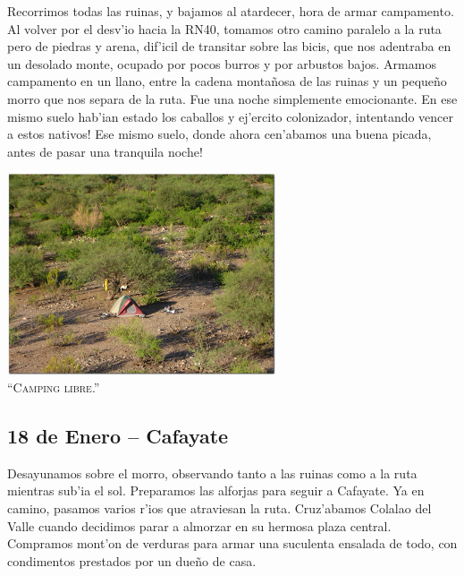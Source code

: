 Recorrimos todas las ruinas, y bajamos al atardecer, hora de armar campamento.
Al volver por el desv'io hacia la {\small RN}40, tomamos otro camino
paralelo a la ruta pero de piedras y arena, dif'icil de transitar sobre las
bicis, que nos adentraba en un desolado monte, ocupado por pocos burros y por
arbustos bajos. Armamos campamento en un llano, entre la cadena monta\~nosa de
las ruinas y un peque\~no morro que nos separa de la ruta. Fue una noche
simplemente emocionante. \textexclamdown En ese mismo suelo hab'ian estado los
caballos y ej'ercito colonizador, intentando vencer a estos nativos!
\textexclamdown Ese mismo suelo, donde ahora cen'abamos una buena picada, antes
de pasar una tranquila noche!

\begin{center}
\includegraphics[width=300px]{images/DSC0123.JPG}
\textsc{\\``Camping libre.''}
\end{center}

\subsection*{18 de Enero -- Cafayate}

Desayunamos sobre el morro, observando tanto a las ruinas como a la ruta
mientras sub'ia el sol. Preparamos las alforjas para seguir a Cafayate. Ya en
camino, pasamos varios r'ios que atraviesan la ruta. Cruz'abamos Colalao del
Valle cuando decidimos parar a almorzar en su hermosa plaza central. Compramos
mont'on de verduras para armar una suculenta ensalada de todo, con condimentos
prestados por un due\~no de casa.

